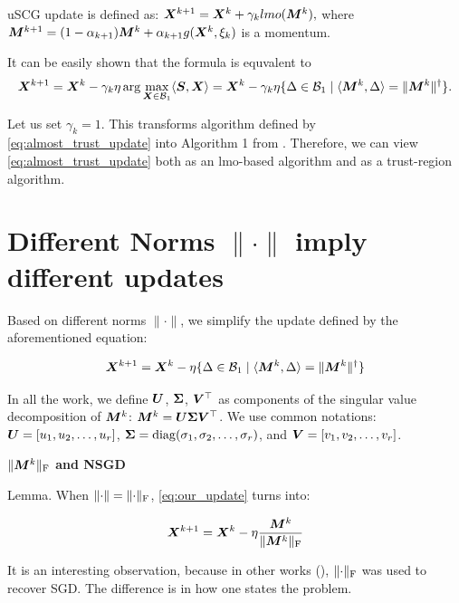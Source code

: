 \documentclass{article} %
\newcommand{\norm}[1]{\lVert #1\rVert}
\newcommand{\cB}{\mathcal{B}}
\DeclarePairedDelimiter{\normf}{\|}{\|_\mathrm{F}}
\def\<#1,#2>{\langle #1,#2\rangle}
\DeclareMathOperator{\diag}{diag}
\begin{document}
uSCG update is defined as:
${\bm{X}}^{k+1} = {\bm{X}}^{k} + \gamma_k lmo({\bm{M}}^k),$ where ${\bm{M}}^{k+1} = (1-\alpha_{k+1}){\bm{M}}^{k} + \alpha_{k+1}g({\bm{X}}^k, \xi_k)$ is a momentum.

It can be easily shown that the formula is equvalent to
\begin{equation}\label{eq:almost_trust_update}
    \mX^{k+1} = \mX^{k} - \gamma_k\eta \arg\max_{\mX \in \cB_1} \<\mS, \mX> = \mX^{k} - \gamma_k\eta \{\Delta \in \cB_1 \mid \<\mM^k, \Delta> = \norm{\mM^k}^\dagger\}.
\end{equation}

Let us set $\gamma_k = 1$. This transforms algorithm defined by \cref{eq:almost_trust_update} into Algorithm 1 from \cite{kovalev2025understanding}. Therefore, we can view \cref{eq:almost_trust_update} both as an lmo-based algorithm and as a trust-region algorithm.

\section{Different Norms $\norm{\cdot}$ imply different updates}

Based on different norms $\norm{\cdot}$, we simplify the update defined by the aforementioned equation:

\begin{equation}\label{eq:our_update}
    \mX^{k+1} = \mX^{k} - \eta \{\Delta \in \cB_1 \mid \<\mM^k, \Delta> = \norm{\mM^k}^\dagger\}
\end{equation}

In all the work, we define ${\bm{U}}$, ${\bm{\Sigma}}$, ${\bm{V}}^\top$ as components of the singular value decomposition of ${\bm{M}}^k$: ${\bm{M}}^k = {\bm{U}} {\bm{\Sigma}} {\bm{V}}^\top$. We use common notations: ${\bm{U}} = [u_1, u_2, \dots, u_r]$, $\mSigma = \diag(\sigma_1, \sigma_2, \dots, \sigma_r)$, and  ${\bm{V}} = [v_1, v_2, \dots, v_r]$.

{\bf $\normf{\mM^{k}}$ and NSGD}

Lemma. When $\norm{\cdot} = \normf{\cdot}$, \cref{eq:our_update} turns into:

\begin{equation}\label{eq:nsgd_update}
    \mX^{k+1} = \mX^{k} - \eta \frac{\mM^k}{\normf{\mM^k}}
\end{equation}

It is an interesting observation, because in other works (\cite{pethick2025training}), $\normf{\cdot}$ was used to recover SGD. The difference is in how one states the problem.
\end{document}
